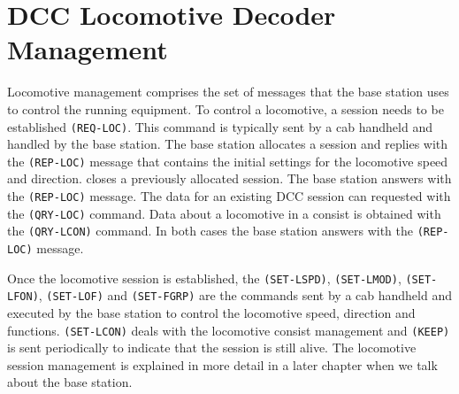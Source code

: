 \section{DCC Locomotive Decoder Management}

Locomotive management comprises the set of messages that the base station uses to control the running equipment. To control a locomotive, a session needs to be established \texttt{(REQ-LOC)}. This command is typically sent by a cab handheld and handled by the base station. The base station allocates a session and replies with the \texttt{(REP-LOC)} message that contains the initial settings for the locomotive speed and direction.  closes a previously allocated session. The base station answers with the \texttt{(REP-LOC)} message. The data for an existing DCC session can requested with the \texttt{(QRY-LOC)} command. Data about a locomotive in a consist is obtained with the \texttt{(QRY-LCON)} command. In both cases the base station answers with the \texttt{(REP-LOC)} message.

\begin{table}[ht!]
    \centering 
    \caption{DCC Locomotive Decoder Management}
\end{table}

Once the locomotive session is established, the \texttt{(SET-LSPD)}, \texttt{(SET-LMOD)}, \texttt{(SET-LFON)}, \texttt{(SET-LOF)} and \texttt{(SET-FGRP)} are the commands sent by a cab handheld and executed by the base station to control the locomotive speed, direction and functions. \texttt{(SET-LCON)} deals with the locomotive consist management and \texttt{(KEEP)} is sent periodically to indicate that the session is still alive. The locomotive session management is explained in more detail in a later chapter when we talk about the base station.

